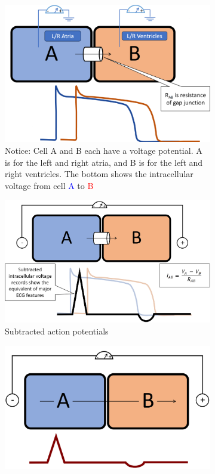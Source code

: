 \documentclass[11pt,fleqn]{book}
\begin{document}
\begin{figure}[h!]
    \centering
    \begin{subfigure}{0.45\textwidth}
        \includegraphics[width=\textwidth]{Pictures/Screenshot 2024-04-03 234113.png}
        \caption{Notice: Cell A and B
each have a voltage
potential. A is for the left and right atria, and B is for the left and right ventricles. The bottom shows the intracellular voltage from cell \textcolor{blue}{A} to \textcolor{red}{B}}
    \end{subfigure}
    \hfill
    \begin{subfigure}{0.45\textwidth}
        \includegraphics[width=\textwidth]{Pictures/Screenshot 2024-04-03 234130.png}
        \caption{Subtracted action potentials}
    \end{subfigure}
    \begin{subfigure}{0.45\textwidth}
        \includegraphics[width=\textwidth]{Pictures/Screenshot 2024-04-03 234139.png}

\end{subfigure}
\end{figure}
\end{document}
